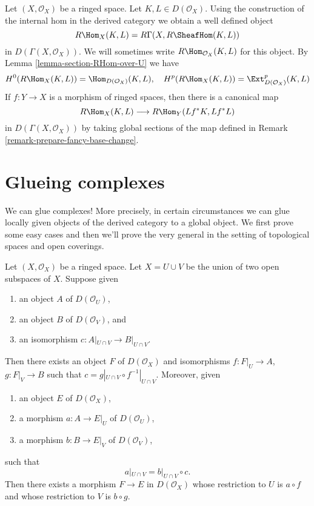 \noindent
Let $(X, \mathcal{O}_X)$ be a ringed space. Let $K, L \in D(\mathcal{O}_X)$.
Using the construction of the internal hom in the derived category we
obtain a well defined object
$$
R\Hom_X(K, L) = R\Gamma(X, R\SheafHom(K, L))
$$
in $D(\Gamma(X, \mathcal{O}_X))$. We will sometimes write
$R\Hom_{\mathcal{O}_X}(K, L)$ for this object.
By Lemma \ref{lemma-section-RHom-over-U}
we have
$$
H^0(R\Hom_X(K, L)) = \Hom_{D(\mathcal{O}_X)}(K, L),
\quad
H^p(R\Hom_X(K, L)) = \Ext_{D(\mathcal{O}_X)}^p(K, L)
$$
If $f : Y \to X$ is a morphism of ringed spaces, then there is
a canonical map
$$
R\Hom_X(K, L) \longrightarrow R\Hom_Y(Lf^*K, Lf^*L)
$$
in $D(\Gamma(X, \mathcal{O}_X))$ by taking global sections of the map
defined in Remark \ref{remark-prepare-fancy-base-change}.








\section{Glueing complexes}
\label{section-glueing-complexes}

\noindent
We can glue complexes! More precisely, in certain circumstances we can
glue locally given objects of the derived category to a global object.
We first prove some easy cases and then we'll prove the very general
\cite[Theorem 3.2.4]{BBD}
in the setting of topological spaces and open coverings.

\begin{lemma}
\label{lemma-glue}
Let $(X, \mathcal{O}_X)$ be a ringed space. Let $X = U \cup V$ be
the union of two open subspaces of $X$. Suppose given
\begin{enumerate}
\item an object $A$ of $D(\mathcal{O}_U)$,
\item an object $B$ of $D(\mathcal{O}_V)$, and
\item an isomorphism $c : A|_{U \cap V} \to B|_{U \cap V}$.
\end{enumerate}
Then there exists an object $F$ of $D(\mathcal{O}_X)$
and isomorphisms $f : F|_U \to A$, $g : F|_V \to B$ such
that $c = g|_{U \cap V} \circ f^{-1}|_{U \cap V}$.
Moreover, given
\begin{enumerate}
\item an object $E$ of $D(\mathcal{O}_X)$,
\item a morphism $a : A \to E|_U$ of $D(\mathcal{O}_U)$,
\item a morphism $b : B \to E|_V$ of $D(\mathcal{O}_V)$, 
\end{enumerate}
such that
$$
a|_{U \cap V}  = b|_{U \cap V} \circ c.
$$
Then there exists a morphism $F \to E$ in $D(\mathcal{O}_X)$
whose restriction to $U$ is $a \circ f$
and whose restriction to $V$ is $b \circ g$.
\end{lemma}

